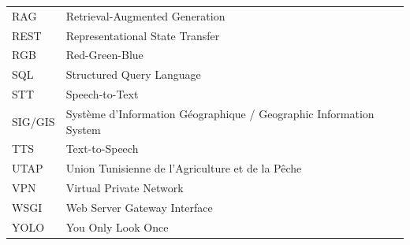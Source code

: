 \begin{longtable}{@{}lp{10cm}@{}}
RAG     & Retrieval-Augmented Generation \\
REST    & Representational State Transfer \\
RGB     & Red-Green-Blue \\
SQL     & Structured Query Language \\
STT     & Speech-to-Text \\
SIG/GIS & Système d'Information Géographique / Geographic Information System \\
TTS     & Text-to-Speech \\
UTAP    & Union Tunisienne de l'Agriculture et de la Pêche \\
VPN     & Virtual Private Network \\
WSGI    & Web Server Gateway Interface \\
YOLO    & You Only Look Once \\
\bottomrule
\end{longtable}

\cleardoublepage
